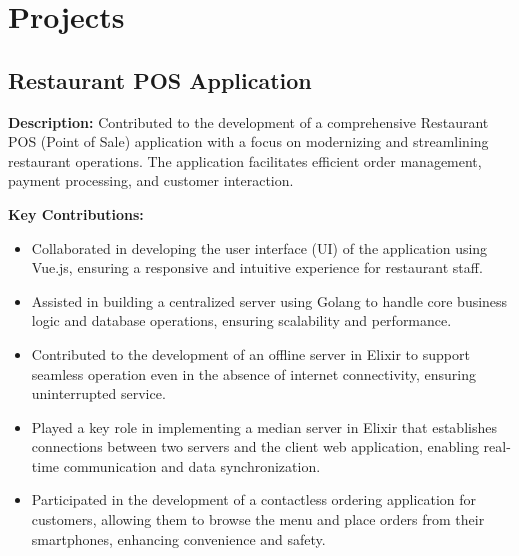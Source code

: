 \documentclass{resume} %
\makeatletter
\newcommand{\entry}[2]{#1 & #2 \tabularnewline} %
\newcommand{\tableEnv}[2]{%
  \begin{rSection}{#1} %
    \begin{adjustwidth}{0.0in}{0.1in} %
      \begin{tabularx}{\linewidth}{@{} >{\bfseries}l @{\hspace{6ex}} X @{}}
        #2 %
      \end{tabularx}
    \end{adjustwidth}
  \end{rSection}
}
\makeatother
\begin{document}

    
\section*{Projects}

\subsection*{Restaurant POS Application}

\textbf{Description:} Contributed to the development of a comprehensive Restaurant POS (Point of Sale) application with a focus on modernizing and streamlining restaurant operations. The application facilitates efficient order management, payment processing, and customer interaction.

\textbf{Key Contributions:}
\begin{itemize}
    \item Collaborated in developing the user interface (UI) of the application using Vue.js, ensuring a responsive and intuitive experience for restaurant staff.
    \item Assisted in building a centralized server using Golang to handle core business logic and database operations, ensuring scalability and performance.
    \item Contributed to the development of an offline server in Elixir to support seamless operation even in the absence of internet connectivity, ensuring uninterrupted service.
    \item Played a key role in implementing a median server in Elixir that establishes connections between two servers and the client web application, enabling real-time communication and data synchronization.
    \item Participated in the development of a contactless ordering application for customers, allowing them to browse the menu and place orders from their smartphones, enhancing convenience and safety.
\end{itemize}
\end{document}
